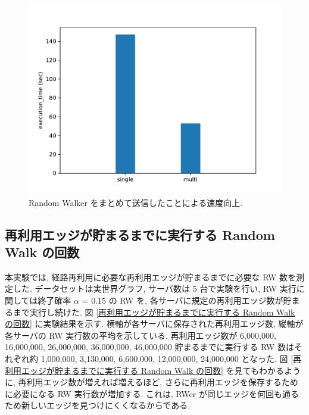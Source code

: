 \begin{figure}[t]
    \centering
    \includegraphics[scale=0.8]{figure/AR_send_num.pdf}
    \caption{Random Walker をまとめて送信したことによる速度向上.}
    \label{Random Walker の送信形態を変化させたときの実行時間}
\end{figure}

\subsection{再利用エッジが貯まるまでに実行する Random Walk の回数}\label{再利用エッジが貯まるまでに実行する Random Walk 実行数}

本実験では, 経路再利用に必要な再利用エッジが貯まるまでに必要な RW 数を測定した. データセットは実世界グラフ, サーバ数は 5 台で実験を行い, RW 実行に関しては終了確率 $\alpha$ = 0.15 の RW を, 各サーバに規定の再利用エッジ数が貯まるまで実行し続けた. 図 \ref{再利用エッジが貯まるまでに実行する Random Walk の回数} に実験結果を示す. 横軸が各サーバに保存された再利用エッジ数, 縦軸が各サーバの RW 実行数の平均を示している. 再利用エッジ数が 6,000,000, 16,000,000, 26,000,000, 36,000,000, 46,000,000 貯まるまでに実行する RW 数はそれぞれ約 1,000,000, 3,130,000, 6,600,000, 12,000,000, 24,000,000 となった. 図 \ref{再利用エッジが貯まるまでに実行する Random Walk の回数} を見てもわかるように, 再利用エッジ数が増えれば増えるほど, さらに再利用エッジを保存するために必要になる RW 実行数が増加する. これは, RWer が同じエッジを何回も通るため新しいエッジを見つけにくくなるからである. 

